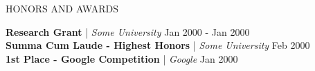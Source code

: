 \begin{rSection}{HONORS AND AWARDS}

{\bf Research Grant} | \textit{Some University} \hfill {Jan 2000 - Jan 2000} 
\vspace{0.5em}\\
{\bf Summa Cum Laude - Highest Honors} | \textit{Some University} \hfill {Feb 2000} 
\vspace{0.5em}\\
{\bf 1st Place - Google Competition} | \textit{Google} \hfill {Jan 2000} 

\end{rSection}

